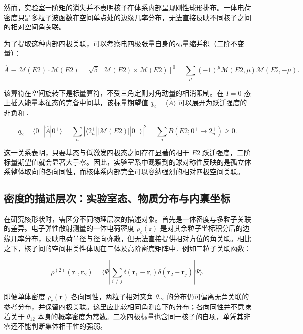 然而，实验室一阶矩的消失并不表明核子在体系内部呈现刚性球形排布。一体电荷密度只是多粒子波函数在空间单点处的边缘几率分布，无法直接反映不同核子之间的相对空间角关联。

为了提取这种内部四极关联，可以考察电四极张量自身的标量缩并积（二阶不变量）：

\begin{equation}\label{eq:1-2-8}
\hat{A} \equiv \mathcal{M}(E2) \cdot \mathcal{M}(E2) = \sqrt{5} [\mathcal{M}(E2) \times \mathcal{M}(E2)]^0 = \sum_\mu (-1)^\mu \mathcal{M}(E2, \mu) \mathcal{M}(E2, -\mu).
\end{equation}

该算符在空间旋转下是标量算符，不受三角定则对角动量的相消限制。在 $I=0$ 态上插入能量本征态的完备中间基，该标量期望值 $q_2 = \langle \hat{A} \rangle$ 可以展开为跃迁强度的非负和：

\begin{equation}\label{eq:1-2-9}
q_2 = \langle 0^+ | \hat{A} | 0^+ \rangle = \sum_n |\langle 2_n^+ || \mathcal{M}(E2) || 0^+ \rangle|^2 = \sum_n B(E2; 0^+ \to 2_n^+) \ge 0.
\end{equation}

这一关系表明，只要基态与低激发四极态之间存在显著的相干 $E2$ 跃迁强度，二阶标量期望值就会显著大于零。因此，实验室系中观察到的球对称性反映的是孤立体系整体取向的各向同性，而核体系内部完全可以容纳强烈的相对四极空间关联。

\subsection{密度的描述层次：实验室态、物质分布与内禀坐标}\label{sec:1-2-2}

在研究核形状时，需区分不同物理层次的描述对象。首先是一体密度与多粒子关联的差异。电子弹性散射测量的一体电荷密度 $\rho_c(\mathbf{r})$ 是对其余粒子坐标积分后的边缘几率分布，反映电荷半径与径向弥散，但无法直接提供相对方位的角关联。相比之下，核子间的空间相关性体现在二体及高阶密度矩阵中，例如二粒子关联函数：

\begin{equation}\label{eq:1-2-10}
\rho^{(2)}(\mathbf{r}_1, \mathbf{r}_2) = \langle \Psi | \sum_{i \ne j} \delta(\mathbf{r}_1 - \mathbf{r}_i) \delta(\mathbf{r}_2 - \mathbf{r}_j) | \Psi \rangle.
\end{equation}

即便单体密度 $\rho_c(\mathbf{r})$ 各向同性，两粒子相对夹角 $\theta_{12}$ 的分布仍可偏离无角关联的参考分布，并保留四极关联。这里应比较相同角测度下的分布；各向同性并不意味着关于 $\theta_{12}$ 本身的概率密度为常数。二次四极标量也含同一核子的自项，单凭其非零还不能判断集体相干性的强弱。

